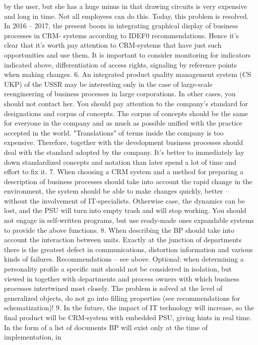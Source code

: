 by the user, but she has a huge minus in that drawing circuits is very
expensive and long in time. Not all employees can do this.
Today, this problem is resolved. In 2016 -- 2017, the present
boom in integrating graphical display of business processes in CRM-
systems according to IDEF0 recommendations. Hence it’s clear that it’s worth
pay attention to CRM-systems that have just such
opportunities and use them. It is important to consider monitoring for
indicators indicated above, differentiation of access rights, signaling by
reference points when making changes.
6. An integrated product quality management system (CS UKP) of the USSR may be
interesting only in the case of large-scale reengineering of business processes in
large corporations. In other cases, you should not contact her.
You should pay attention to the company’s standard for designations and
corpus of concepts. The corpus of concepts should be the same for everyone in the company and
as much as possible unified with the practice accepted in the world. "Translations" of terms
inside the company is too expensive. Therefore, together with the development
business processes should deal with the standard adopted by the company.
It’s better to immediately lay down standardized concepts and notation than later
spend a lot of time and effort to fix it.
7. When choosing a CRM system and a method for preparing a description of business processes
should take into account the rapid change in the environment, the system should be able to
make changes quickly, better -- without the involvement of IT-specialists. Otherwise
case, the dynamics can be lost, and the PSU will turn into empty trash and
will stop working.
You should not engage in self-written programs, but use ready-made ones
expandable systems to provide the above
functions.
8. When describing the BP should take into account the interaction between units. Exactly
at the junction of departments there is the greatest defect in communications, distortion
information and various kinds of failures.
Recommendations -- see above. Optional: when determining a personality profile
a specific unit should not be considered in isolation, but viewed in
together with departments and process owners with which business processes
intertwined most closely. The problem is solved at the level of generalized objects,
do not go into filling properties (see recommendations for schematization)!
9. In the future, the impact of IT technology will increase, so the final product will be
CRM-system with embedded PSU, giving hints in real time.
In the form of a list of documents BP will exist only at the time of implementation, in
